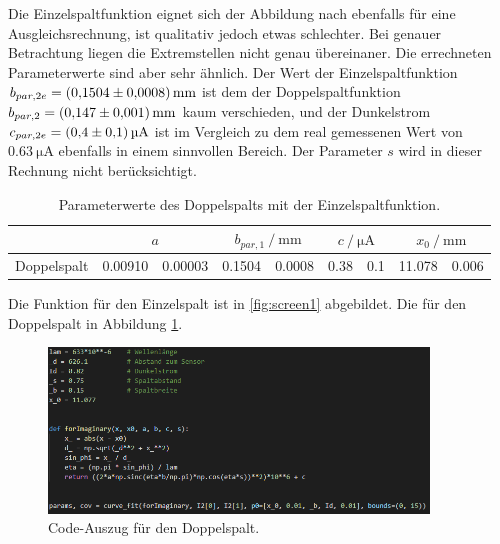 Die Einzelspaltfunktion eignet sich der Abbildung nach ebenfalls für eine Ausgleichsrechnung, ist qualitativ jedoch etwas schlechter. Bei genauer Betrachtung liegen die Extremstellen nicht genau übereinaner.
Die errechneten Parameterwerte sind aber sehr ähnlich. Der Wert der Einzelspaltfunktion $b_{par, 2e} = \SI{0.1504 \pm 0.0008}{\milli\meter}$ ist dem der Doppelspaltfunktion $b_{par, 2} = \SI{0.147 \pm 0.001}{\milli\meter}$ kaum verschieden,
und der Dunkelstrom $c_{par, 2e} = \SI{0.4 \pm 0.1}{\micro\ampere}$ ist im Vergleich zu dem real gemessenen Wert von $\SI{0.63}{\micro\ampere}$ ebenfalls in einem sinnvollen Bereich.
Der Parameter $s$ wird in dieser Rechnung nicht berücksichtigt.

\begin{table}
    \centering
    \caption{Parameterwerte des Doppelspalts mit der Einzelspaltfunktion.}
    \label{tab:parDoppelEinzel}
    \begin{tabular}{c S[table-format=1.5]@{\,\( \pm \)\,}S[table-format=1.5] 
        S[table-format=1.4]@{\,\( \pm \)\,}S[table-format=1.4] 
        S[table-format=1.1]@{\,\( \pm \)\,}S[table-format=1.1]
        S[table-format=1.3]@{\,\( \pm \)\,}S[table-format=1.3]}
        \toprule
        &  &  &  &  \\
        \midrule
        Doppelspalt & 0.00910&0.00003 & 0.1504&0.0008 & 0.38&0.1 & 11.078&0.006\\
    \end{tabular}
\end{table}

Die Funktion für den Einzelspalt ist in \ref{fig:screen1} abgebildet. Die für den Doppelspalt in Abbildung \ref{fig:screen2}.

\begin{figure}
    \centering
    \includegraphics[width=0.9\textwidth]{plots/screen2.png}
    \caption{Code-Auszug für den Doppelspalt.}
    \label{fig:screen2}
\end{figure}


